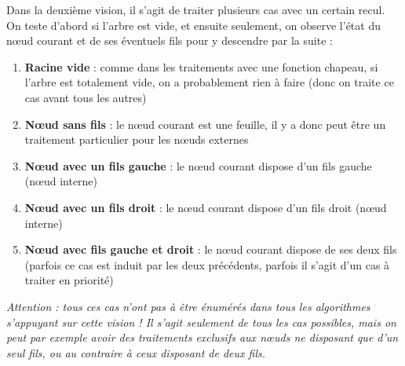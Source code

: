 \documentclass[11pt,a4paper]{article}
\begin{document}
Dans la deuxième vision, il s'agit de traiter plusieurs cas avec un certain recul.
On teste d'abord si l'arbre est vide, et ensuite seulement, on observe l'état du nœud courant et de ses éventuels fils pour y descendre par la suite :

\begin{enumerate}
\item \textbf{Racine vide} : comme dans les traitements avec une fonction chapeau, si l'arbre est totalement vide, on a probablement rien à faire (donc on traite ce cas avant tous les autres)
\item \textbf{Nœud sans fils} : le nœud courant est une feuille, il y a donc peut être un traitement particulier pour les nœuds externes
\item \textbf{Nœud avec un fils gauche} : le nœud courant dispose d'un fils gauche (nœud interne)
\item \textbf{Nœud avec un fils droit} : le nœud courant dispose d'un fils droit (nœud interne)
\item \textbf{Nœud avec fils gauche et droit} : le nœud courant dispose de ses deux fils (parfois ce cas est induit par les deux précédents, parfois il s'agit d'un cas à traiter en priorité)
\end{enumerate}

\textit{Attention : tous ces cas n'ont pas à être énumérés dans tous les algorithmes s'appuyant sur cette vision !
Il s'agit seulement de tous les cas possibles, mais on peut par exemple avoir des traitements exclusifs aux nœuds ne disposant que d'un seul fils, ou au contraire à ceux disposant de deux fils.}

\bigskip

\end{document}

